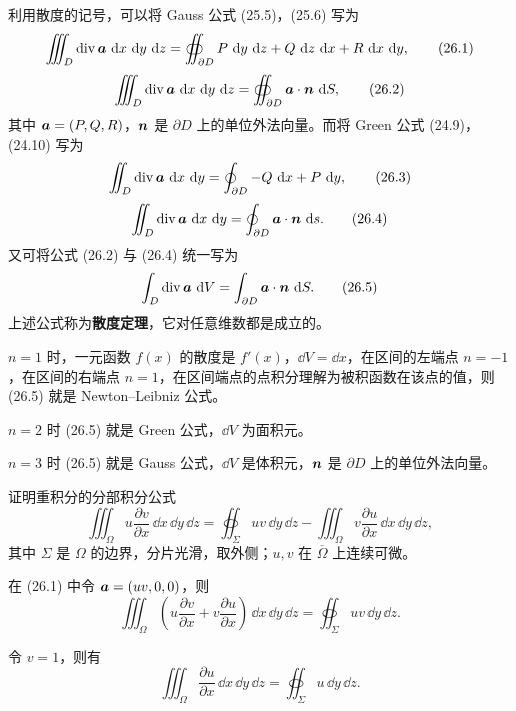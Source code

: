 利用散度的记号，可以将 Gauss 公式 (25.5)，(25.6) 写为
\begin{equation}
  \iiint_D \operatorname{div}\vect{a}\,\dd x\,\dd y\,\dd z
  =\oiint_{\partial D} P\,\dd y\,\dd z+Q\,\dd z\,\dd x+R\,\dd x\,\dd y,
  \tag{26.1}
  \label{eq:26.1}
\end{equation}
\begin{equation}
  \iiint_D \operatorname{div}\bm{a}\,\mathop{}\!\mathrm{d} x\,\mathop{}\!\mathrm{d} y\,\mathop{}\!\mathrm{d} z
  =\oiint_{\partial D}\bm{a}\cdot\bm{n}\,\mathop{}\!\mathrm{d} S,
  \tag{26.2}
  \label{eq:26.2}
\end{equation}
其中 $\bm{a}=(P,Q,R)$，$\bm{n}$ 是 $\partial D$ 上的单位外法向量。而将 Green 公式 (24.9)，(24.10) 写为
\begin{equation}
  \iint_D \operatorname{div}\bm{a}\,\mathop{}\!\mathrm{d} x\,\mathop{}\!\mathrm{d} y
  =\oint_{\partial D}-Q\,\mathop{}\!\mathrm{d} x+P\,\mathop{}\!\mathrm{d} y,
  \tag{26.3}
  \label{eq:26.3}
\end{equation}
\begin{equation}
  \iint_D \operatorname{div}\bm{a}\,\mathop{}\!\mathrm{d} x\,\mathop{}\!\mathrm{d} y
  =\oint_{\partial D}\bm{a}\cdot\bm{n}\,\mathop{}\!\mathrm{d} s.
  \tag{26.4}
  \label{eq:26.4}
\end{equation}
又可将公式 (26.2) 与 (26.4) 统一写为
\begin{equation}
  \int_D \operatorname{div}\bm{a}\,\mathop{}\!\mathrm{d} V
  =\int_{\partial D}\bm{a}\cdot\bm{n}\,\mathop{}\!\mathrm{d} S.
  \tag{26.5}
  \label{eq:26.5}
\end{equation}
上述公式称为\textbf{散度定理}，它对任意维数都是成立的。

$n=1$ 时，一元函数 $f(x)$ 的散度是 $f'(x)$，$\dd V=\dd x$，在区间的左端点 $n=-1$，在区间的右端点 $n=1$，在区间端点的点积分理解为被积函数在该点的值，则 (26.5) 就是 Newton--Leibniz 公式。

$n=2$ 时 (26.5) 就是 Green 公式，$\dd V$ 为面积元。

$n=3$ 时 (26.5) 就是 Gauss 公式，$\dd V$ 是体积元，$\bm{n}$ 是 $\partial D$ 上的单位外法向量。

\begin{xexample}[26.1.1]
证明重积分的分部积分公式
\[
  \iiint_\Omega u\frac{\partial v}{\partial x}\,\dd x\,\dd y\,\dd z
  =\oiint_\Sigma uv\,\dd y\,\dd z
  -\iiint_\Omega v\frac{\partial u}{\partial x}\,\dd x\,\dd y\,\dd z,
\]
其中 $\Sigma$ 是 $\Omega$ 的边界，分片光滑，取外侧；$u,v$ 在 $\overline\Omega$ 上连续可微。
\end{xexample}
\begin{xproof}
在 (26.1) 中令 $\bm{a}=(uv,0,0)$，则
\[
  \iiint_\Omega\left(u\frac{\partial v}{\partial x}+v\frac{\partial u}{\partial x}\right)\,\dd x\,\dd y\,\dd z
  =\oiint_\Sigma uv\,\dd y\,\dd z.
\]
\end{xproof}
\begin{xremark}
令 $v=1$，则有
\[
  \iiint_\Omega\frac{\partial u}{\partial x}\,\dd x\,\dd y\,\dd z
  =\oiint_\Sigma u\,\dd y\,\dd z.
\]
\end{xremark}

